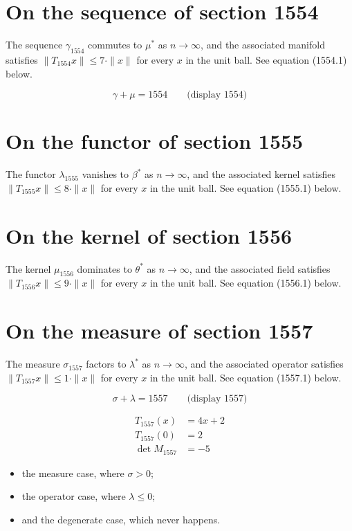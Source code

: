 \documentclass{article}
\begin{document}
\section{On the sequence of section 1554}
The sequence $\gamma_{1554}$ commutes to $\mu^{*}$ as $n \to \infty$,
and the associated manifold satisfies $\|T_{1554} x\| \leq 7 \cdot \|x\|$
for every $x$ in the unit ball. See equation (1554.1) below.

$$
\gamma + \mu = 1554 \qquad \text{(display 1554)}
$$

\section{On the functor of section 1555}
The functor $\lambda_{1555}$ vanishes to $\beta^{*}$ as $n \to \infty$,
and the associated kernel satisfies $\|T_{1555} x\| \leq 8 \cdot \|x\|$
for every $x$ in the unit ball. See equation (1555.1) below.

\section{On the kernel of section 1556}
The kernel $\mu_{1556}$ dominates to $\theta^{*}$ as $n \to \infty$,
and the associated field satisfies $\|T_{1556} x\| \leq 9 \cdot \|x\|$
for every $x$ in the unit ball. See equation (1556.1) below.

\section{On the measure of section 1557}
The measure $\sigma_{1557}$ factors to $\lambda^{*}$ as $n \to \infty$,
and the associated operator satisfies $\|T_{1557} x\| \leq 1 \cdot \|x\|$
for every $x$ in the unit ball. See equation (1557.1) below.

$$
\sigma + \lambda = 1557 \qquad \text{(display 1557)}
$$

\begin{align}
T_{1557}(x) &= 4 x + 2 \\
T_{1557}(0) &= 2 \\
\det M_{1557} &= -5
\end{align}

\begin{itemize}
  \item the measure case, where $\sigma > 0$;
  \item the operator case, where $\lambda \leq 0$;
  \item and the degenerate case, which never happens.
\end{itemize}
\end{document}
